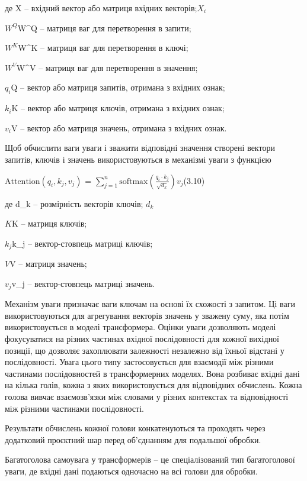 \documentclass[
]{article}
\begin{document}
де X -- вхідний вектор або матриця вхідних векторів;\(X_{i}\)

\(W^{Q}\)W\^{}Q -- матриця ваг для перетворення в запити;

\(W^{K}\)W\^{}K -- матриця ваг для перетворення в ключі;

\(W^{V}\)W\^{}V -- матриця ваг для перетворення в значення;

\(q_{i}\)Q -- вектор або матриця запитів, отримана з вхідних ознак;

\(k_{i}\)K -- вектор або матриця ключів, отримана з вхідних ознак;

\(v_{i}\)V -- вектор або матриця значень, отримана з вхідних ознак.

Щоб обчислити ваги уваги і зважити відповідні значення створені вектори запитів, ключів і значень використовуються в механізмі уваги з функцією

\(\text{Attention}\left( q_{i},k_{j},v_{j} \right)\text{ = }\sum_{j = 1}^{n}{\text{softmax}\left( \frac{q_{i} \cdot k_{j}}{\sqrt{d_{k}}} \right)v_{j}}\)(3.10)

де d\_k -- розмірність векторів ключів; \(d_{k}\)

\(K\)K -- матриця ключів;

\(k_{j}\)k\_j -- вектор-стовпець матриці ключів;

\(V\)V -- матриця значень;

\(v_{j}\)v\_j -- вектор-стовпець матриці значень.

Механізм уваги призначає ваги ключам на основі їх схожості з запитом. Ці ваги використовуються для агрегування векторів значень у зважену суму, яка потім використовується в моделі трансформера. Оцінки уваги дозволяють моделі фокусуватися на різних частинах вхідної послідовності для кожної вихідної позиції, що дозволяє захоплювати залежності незалежно від їхньої відстані у послідовності. Увага цього типу застосовується для взаємодії між різними части\-нами послідовностей в трансформерних моделях. Вона розбиває вхідні дані на кілька голів, кожна з яких використовується для відповідних обчислень. Кожна голова вивчає взаємозв'язки між словами у різних контекстах та відповідності між різними частинами послідовності.

Результати обчислень кожної голови конкатенуються та проходять через додатковий проєктний шар перед об'єднанням для подальшої обробки.

Багатоголова самоувага у трансформерів -- це спеціалізований тип багатоголової уваги, де вхідні дані подаються одночасно на всі голови для обробки.
\end{document}
